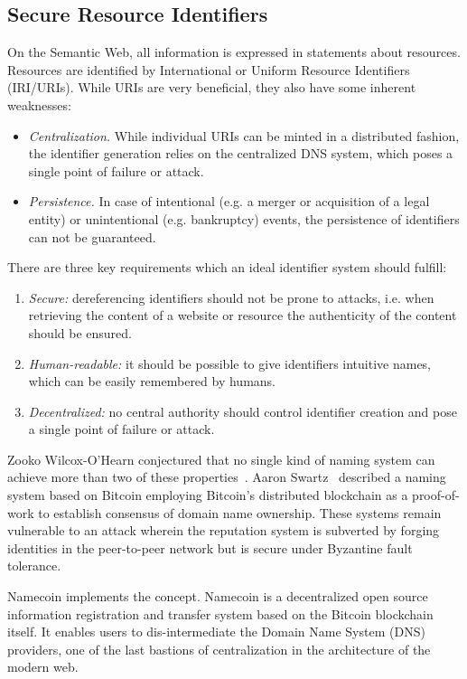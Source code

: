\subsection{Secure Resource Identifiers}

On the Semantic Web, all information is expressed in statements about resources.
Resources are identified by International or Uniform Resource Identifiers (IRI/URIs). 
While URIs are very beneficial, they also have some inherent weaknesses:

\begin{itemize}
    \item \emph{Centralization.} While individual URIs can be minted in a distributed fashion, the identifier generation relies on the centralized DNS system, which poses a single point of failure or attack.
    \item \emph{Persistence.} In case of intentional (e.g. a merger or acquisition of a legal entity) or unintentional (e.g. bankruptcy) events, the persistence of identifiers can not be guaranteed.
\end{itemize}

There are three key requirements which an ideal identifier system should fulfill:

\begin{enumerate}
    \item \emph{Secure:} dereferencing identifiers should not be prone to attacks, i.e. when retrieving the content of a website or resource the authenticity of the content should be ensured.
    \item \emph{Human-readable:} it should be possible to give identifiers intuitive names, which can be easily remembered by humans.
    \item \emph{Decentralized:} no central authority should control identifier creation and pose a single point of failure or attack.
\end{enumerate}

Zooko Wilcox-O'Hearn conjectured that no single kind of naming system can achieve more than two of these properties~\cite{wilcox2003names}.
Aaron Swartz~\cite{aaronswartz2011} described a naming system based on Bitcoin employing Bitcoin's distributed blockchain as a proof-of-work to establish consensus of domain name ownership.
These systems remain vulnerable to an attack wherein the reputation system is subverted by forging identities in the peer-to-peer network but is secure under Byzantine fault tolerance.

Namecoin implements the concept.
Namecoin is a decentralized open source information registration and transfer system based on the Bitcoin blockchain itself.
It enables users to dis-intermediate the Domain Name System (DNS) providers, one of the last bastions of centralization in the architecture of the modern web.

